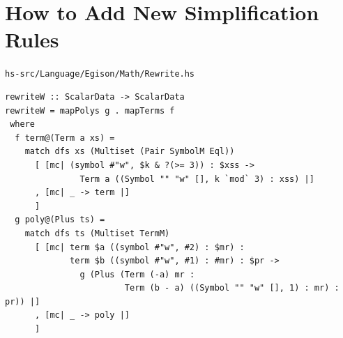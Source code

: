 \chapter{How to Add New Simplification Rules}\label{rewrite}

\texttt{hs-src/Language/Egison/Math/Rewrite.hs}

\begin{lstlisting}[language=egison,numbers=none]
rewriteW :: ScalarData -> ScalarData
rewriteW = mapPolys g . mapTerms f
 where
  f term@(Term a xs) =
    match dfs xs (Multiset (Pair SymbolM Eql))
      [ [mc| (symbol #"w", $k & ?(>= 3)) : $xss ->
               Term a ((Symbol "" "w" [], k `mod` 3) : xss) |]
      , [mc| _ -> term |]
      ]
  g poly@(Plus ts) =
    match dfs ts (Multiset TermM)
      [ [mc| term $a ((symbol #"w", #2) : $mr) :
             term $b ((symbol #"w", #1) : #mr) : $pr ->
               g (Plus (Term (-a) mr :
                        Term (b - a) ((Symbol "" "w" [], 1) : mr) : pr)) |]
      , [mc| _ -> poly |]
      ]
\end{lstlisting}
